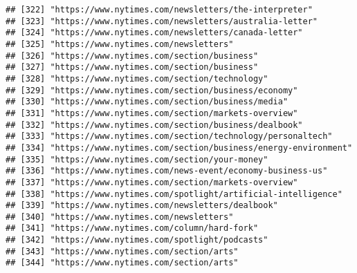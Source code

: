 \documentclass[
]{article}
\begin{document}
\begin{verbatim}
## [322] "https://www.nytimes.com/newsletters/the-interpreter"                                                       
## [323] "https://www.nytimes.com/newsletters/australia-letter"                                                      
## [324] "https://www.nytimes.com/newsletters/canada-letter"                                                         
## [325] "https://www.nytimes.com/newsletters"                                                                       
## [326] "https://www.nytimes.com/section/business"                                                                  
## [327] "https://www.nytimes.com/section/business"                                                                  
## [328] "https://www.nytimes.com/section/technology"                                                                
## [329] "https://www.nytimes.com/section/business/economy"                                                          
## [330] "https://www.nytimes.com/section/business/media"                                                            
## [331] "https://www.nytimes.com/section/markets-overview"                                                          
## [332] "https://www.nytimes.com/section/business/dealbook"                                                         
## [333] "https://www.nytimes.com/section/technology/personaltech"                                                   
## [334] "https://www.nytimes.com/section/business/energy-environment"                                               
## [335] "https://www.nytimes.com/section/your-money"                                                                
## [336] "https://www.nytimes.com/news-event/economy-business-us"                                                    
## [337] "https://www.nytimes.com/section/markets-overview"                                                          
## [338] "https://www.nytimes.com/spotlight/artificial-intelligence"                                                 
## [339] "https://www.nytimes.com/newsletters/dealbook"                                                              
## [340] "https://www.nytimes.com/newsletters"                                                                       
## [341] "https://www.nytimes.com/column/hard-fork"                                                                  
## [342] "https://www.nytimes.com/spotlight/podcasts"                                                                
## [343] "https://www.nytimes.com/section/arts"                                                                      
## [344] "https://www.nytimes.com/section/arts"                                                                      

\end{verbatim}
\end{document}
